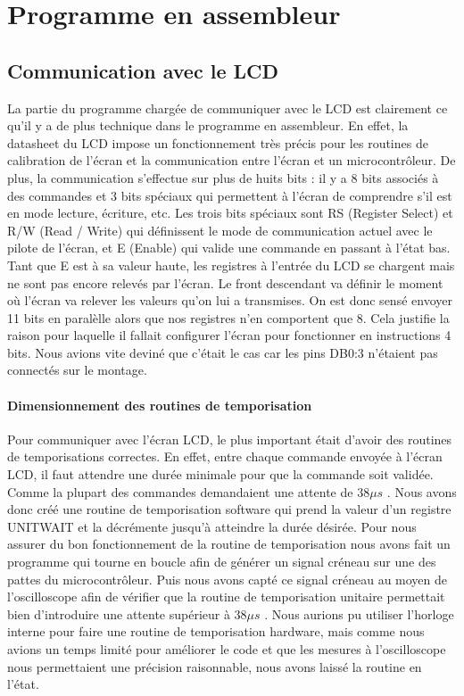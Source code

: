 \documentclass[a4paper,11pt,titlepage]{article}
\begin{document}
\section{Programme en assembleur}
\subsection{Communication avec le LCD}
La partie du programme chargée de communiquer avec le LCD est clairement ce qu'il y a de plus technique dans le programme en assembleur. En effet, la datasheet du LCD impose un fonctionnement très précis pour les routines de calibration de l'écran et la communication entre l'écran et un microcontrôleur. De plus, la communication s'effectue sur plus de huits bits : il y a 8 bits associés à des commandes et 3 bits spéciaux qui permettent à l'écran de comprendre s'il est en mode lecture, écriture, etc. Les trois bits spéciaux sont RS (Register Select) et R/W (Read / Write) qui définissent le mode de communication actuel avec le pilote de l'écran, et E (Enable) qui valide une commande en passant à l'état bas. Tant que E est à sa valeur haute, les registres à l'entrée du LCD se chargent mais ne sont pas encore relevés par l'écran. Le front descendant va définir le moment où l'écran va relever les valeurs qu'on lui a transmises.
On est donc sensé envoyer 11 bits en paralèlle alors que nos registres n'en comportent que 8. Cela justifie la raison pour laquelle il fallait configurer l'écran pour fonctionner en instructions 4 bits. Nous avions vite deviné que c'était le cas car les pins DB0:3 n'étaient pas connectés sur le montage.

\paragraph{Dimensionnement des routines de temporisation}
Pour communiquer avec l'écran LCD, le plus important était d'avoir des routines de temporisations correctes. En effet, entre chaque commande envoyée à l'écran LCD, il faut attendre une durée minimale pour que la commande soit validée. Comme la plupart des commandes demandaient une attente de $ 38 \mu s $ . Nous avons donc créé une routine de temporisation software qui prend la valeur d'un registre UNIT\textunderscore WAIT et la décrémente jusqu'à atteindre la durée désirée. Pour nous assurer du bon fonctionnement de la routine de temporisation nous avons fait un programme qui tourne en boucle afin de générer un signal créneau sur une des pattes du microcontrôleur. Puis nous avons capté ce signal créneau au moyen de l'oscilloscope afin de vérifier que la routine de temporisation unitaire permettait bien d'introduire une attente supérieur à $ 38 \mu s $ .
Nous aurions pu utiliser l'horloge interne pour faire une routine de temporisation hardware, mais comme nous avions un temps limité pour améliorer le code et que les mesures à l'oscilloscope nous permettaient une précision raisonnable, nous avons laissé la routine en l'état.
\end{document}
